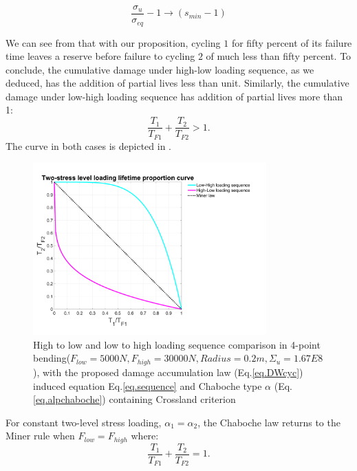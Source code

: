 $$\frac{\sigma_{u}}{\sigma_{eq}} -1 \longrightarrow \left( s_{min}-1\right)  $$


We can see from  that with our proposition, cycling $1$ for fifty percent of its failure time leaves a reserve before failure to cycling $2$ of much less than fifty percent. To conclude, the cumulative damage under high-low loading sequence, as we deduced, has the addition of partial lives less than unit. Similarly, the cumulative damage under low-high loading sequence has addition of partial lives more than 1:
$$\frac{T_1}{T_{F1}}+\frac{T_2}{T_{F2}}>1.$$
The curve in both cases is depicted in .
\begin{figure}[!h]
\centering
\includegraphics[width=0.8\textwidth]{figures//sequence.png} 
\caption{High to low and low to high loading sequence comparison in 4-point bending($F_{low}=5000 N, F_{high}=30000 N, Radius=0.2m, \Sigma_u=1.67E8$), with the proposed damage accumulation law (Eq.\eqref{eq.DWcyc}) induced equation Eq.\eqref{eq.sequence} and Chaboche type $\alpha$ (Eq.\eqref{eq.alpchaboche}) containing Crossland criterion}
\label{fig.sequence}
\end{figure}
For constant two-level stress loading, $\alpha_1=\alpha_2$, the Chaboche law returns to the Miner rule when $F_{low}=F_{high}$ where:
$$\frac{T_1}{T_{F1}}+\frac{T_2}{T_{F2}}=1.$$

\newpage
